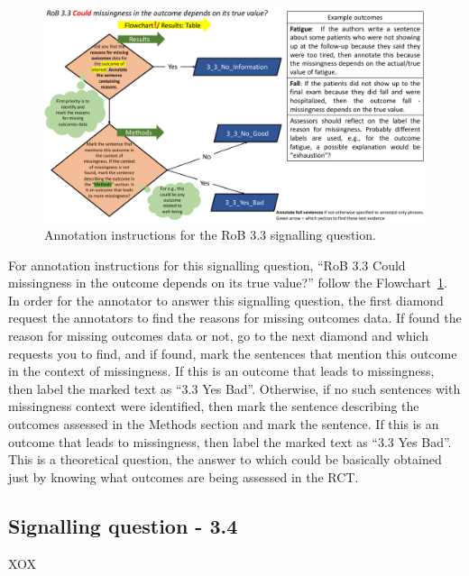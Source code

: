 \documentclass[sn-mathphys,Numbered]{sn-jnl}%
\begin{document}
%
%
%
\begin{figure}[hbt]
    \centering
    \includegraphics[width=\textwidth]{figures/3_3.pdf}
    \caption{Annotation instructions for the RoB 3.3 signalling question.}
    \label{fig:3_3}
\end{figure}
%




For annotation instructions for this signalling question, ``RoB 3.3 Could missingness in the outcome depends on its true value?'' follow the Flowchart~\ref{fig:3_3}.
In order for the annotator to answer this signalling question, the first diamond request the annotators to find the reasons for missing outcomes data.
If found the reason for missing outcomes data or not, go to the next diamond and which requests you to find, and if found, mark the sentences that mention this outcome in the context of missingness.
If this is an outcome that leads to missingness, then label the marked text as ``3.3 Yes Bad''.
Otherwise, if no such sentences with missingness context were identified, then mark the sentence describing the outcomes assessed in the Methods section and mark the sentence.
If this is an outcome that leads to missingness, then label the marked text as ``3.3 Yes Bad''.
This is a theoretical question, the answer to which could be basically obtained just by knowing what outcomes are being assessed in the RCT.
%
%
%
\subsection*{Signalling question - 3.4 }
%
XOX
\end{document}
